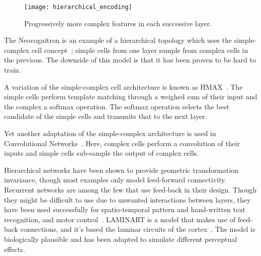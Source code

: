 \begin{figure}[h]
  \begin{center}
    \texttt{[image: hierarchical\_encoding]}
    \caption{Progressively more complex features in each successive layer.}
    \label{fig:vision:hierarchical_encoding}
  \end{center}
\end{figure}

The Neocognitron is an example of a hierarchical topology which uses the simple-complex cell concept~\cite{fukushima1988neocognitron}; simple cells from one layer sample from complex cells in the previous. The downside of this model is that it has been proven to be hard to train.

A variation of the simple-complex cell architecture is known as HMAX~\cite{riesenhuber1999hierarchical}. The simple cells perform template matching through a weighed sum of their input and the complex a softmax operation. The softmax operation selects the best candidate of the simple cells and transmits that to the next layer.

Yet another adaptation of the simple-complex architecture is used in Convolutional Networks~\cite{lecun-1990handwritten}. Here, complex cells perform a convolution of their inputs and simple cells sub-sample the output of complex cells.

Hierarchical networks have been shown to provide geometric transformation invariance, though most examples only model feed-forward connectivity. Recurrent networks are among the few that use feed-back in their design. Though they might be difficult to use due to unwanted interactions between layers, they have been used successfully for spatio-temporal pattern and hand-written text recognition, and motor control~\cite{behnke2003hierarchical}. LAMINART is a model that makes use of feed-back connections, and it's based the laminar circuits of the cortex~\cite{raizada2003laminart}. The model is biologically plausible and has been adapted to simulate different perceptual effects.
